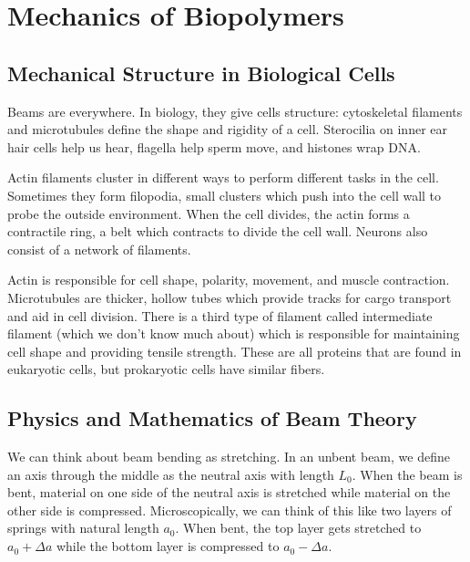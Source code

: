 \documentclass[a4paper,twoside,master.tex]{subfiles}
\begin{document}
\chapter{Mechanics of Biopolymers}

\section{Mechanical Structure in Biological Cells}\label{sec:mechanical_structure_in_biological_cells}

Beams are everywhere. In biology, they give cells structure: cytoskeletal filaments and microtubules define the shape and rigidity of a cell. Sterocilia on inner ear hair cells help us hear, flagella help sperm move, and histones wrap DNA.

Actin filaments cluster in different ways to perform different tasks in the cell. Sometimes they form filopodia, small clusters which push into the cell wall to probe the outside environment. When the cell divides, the actin forms a contractile ring, a belt which contracts to divide the cell wall. Neurons also consist of a network of filaments.

Actin is responsible for cell shape, polarity, movement, and muscle contraction. Microtubules are thicker, hollow tubes which provide tracks for cargo transport and aid in cell division. There is a third type of filament called intermediate filament (which we don't know much about) which is responsible for maintaining cell shape and providing tensile strength. These are all proteins that are found in eukaryotic cells, but prokaryotic cells have similar fibers.

\section{Physics and Mathematics of Beam Theory}\label{sec:physics_and_mathematics_of_beam_theory}

We can think about beam bending as stretching. In an unbent beam, we define an axis through the middle as the neutral axis with length $ L_0 $. When the beam is bent, material on one side of the neutral axis is stretched while material on the other side is compressed. Microscopically, we can think of this like two layers of springs with natural length $ a_0 $. When bent, the top layer gets stretched to $ a_0 + \Delta a $ while the bottom layer is compressed to $ a_0 - \Delta a $.
\end{document}
